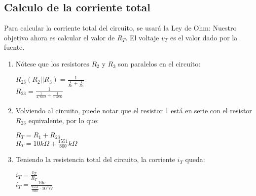     \subsection{Calculo de la corriente total}
    \sangria{} Para calcular la corriente total del circuito, se usará la Ley de Ohm:
    Nuestro objetivo ahora es calcular el valor de $R_T$. El voltaje $v_T$ es el valor dado por la fuente.
    \begin{enumerate}
        \item Nótese que los resistores $R_2$ y $R_3$ son paralelos en el circuito: 
            \begin{center} 
                $R_{23} (R_2 || R_3) = \frac{1}{{\frac{1}{R_2}} + \frac{1}{R_3}}$ \\[10pt]
                $R_{23} = \frac{1}{\frac{1}{4,7k\Omega} + \frac{1}{3,3k\Omega}}$ \\[10pt]
            \end{center}

        \item Volviendo al circuito, puede notar que el resistor 1 está en serie con el resistor $R_{23}$ equivalente, por lo que:
        \begin{center}
            $R_T = R_1 + R_{23}$ \\[10pt]
            $R_T = 10k\Omega + \frac{1551}{800}k\Omega$ \\[10pt]
        \end{center}
        \item Teniendo la resistencia total del circuito, la corriente $i_T$ queda:
            \begin{center}
                $i_T = \frac{v_T}{R_T}$ \\[10pt]
                $i_T = \frac{10v}{\frac{9551}{800}\cdot 10^3 \Omega}$
            \end{center}
            \columnbreak{}
            \begin{center}
            \end{center}
    \end{enumerate}
